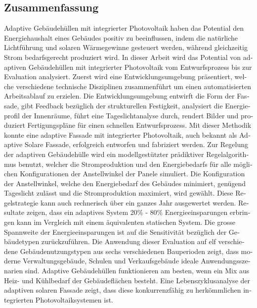 \begingroup
\let\clearpage\relax
\let\cleardoublepage\relax
\let\cleardoublepage\relax

\begin{otherlanguage}{ngerman}
\chapter*{Zusammenfassung}

Adaptive Geb{\"a}udeh{\"u}llen mit integrierter Photovoltaik haben das Potential den Energiehaushalt eines Geb{\"a}udes positiv zu beeinflussen, indem die nat{\"u}rliche Lichtf{\"u}hrung und solaren W{\"a}rmegewinne gesteuert werden, w{\"a}hrend gleichzeitig Strom bedarfsgerecht produziert wird.
In dieser Arbeit wird das Potential von adaptiven Geb{\"a}udeh{\"u}llen mit integrierter Photovoltaik vom Entwurfsprozess bis zur Evaluation analysiert.
Zuerst wird eine Entwicklungsumgebung pr{\"a}sentiert, welche verschiedene technische Disziplinen zusammenf{\"u}hrt um einen automatisierten Arbeitsablauf zu erzielen.
Die Entwicklungsumgebung entwirft die Form der Fassade, gibt Feedback bez{\"u}glich der strukturellen Festigkeit, analysiert die Energieprofil der Innenr{\"a}ume, f{\"u}hrt eine Tageslichtanalyse durch, rendert Bilder und produziert Fertigungspl{\"a}ne f{\"u}r einen schnellen Entwurfsprozess.
Mit dieser Methodik konnte eine adaptive Fassade mit integrierter Photovoltaik, auch bekannt als Adaptive Solare Fassade, erfolgreich entworfen und fabriziert werden.
Zur Regelung der adaptiven Geb{\"a}udeh{\"u}lle wird ein modellgest{\"u}tzter pr{\"a}diktiver Regelalgorithmus benutzt, welcher die Stromproduktion und den Energiebedarfs f{\"u}r alle m{\"o}glichen Konfigurationen der Anstellwinkel der Panele simuliert.
Die Konfiguration der Anstellwinkel, welche den Energiebedarf des Geb{\"a}udes minimiert, gen{\"u}gend Tageslicht zul{\"a}sst und die Stromproduktion maximiert, wird gew{\"a}hlt.
Diese Regelstrategie kann auch rechnerisch {\"u}ber ein ganzes Jahr ausgewertet werden. Resultate zeigen, dass ein adaptives System 20\% - 80\% Energieeinsparungen erbringen kann im Vergleich mit einem {\"a}quivalenten statischen System.
Die grosse Spannweite der Energieeinsparungen ist auf die Sensitivit{\"a}t bez{\"u}glich der Geb{\"a}udetypen zur{\"u}ckzuf{\"u}hren.
Die Anwendung dieser Evaluation auf elf verschiedene Geb{\"a}udenutzungstypen aus sechs verschiedenen Bauperioden zeigt, dass moderne Verwaltungsgeb{\"a}ude, Schulen und Verkaufsgeb{\"a}ude ideale Anwendungsszenarien sind.
Adaptive Geb{\"a}udeh{\"u}llen funktionieren am besten, wenn ein Mix aus Heiz- und K{\"u}hlbedarf der Geb{\"a}udefl{\"a}chen besteht.
Eine Lebenszyklusanalyse der adaptiven solaren Fassade zeigt, dass diese konkurrenzf{\"a}hig zu herk{\"o}mmlichen integrierten Photovoltaiksystemen ist.

\end{otherlanguage}

\endgroup

\vfill